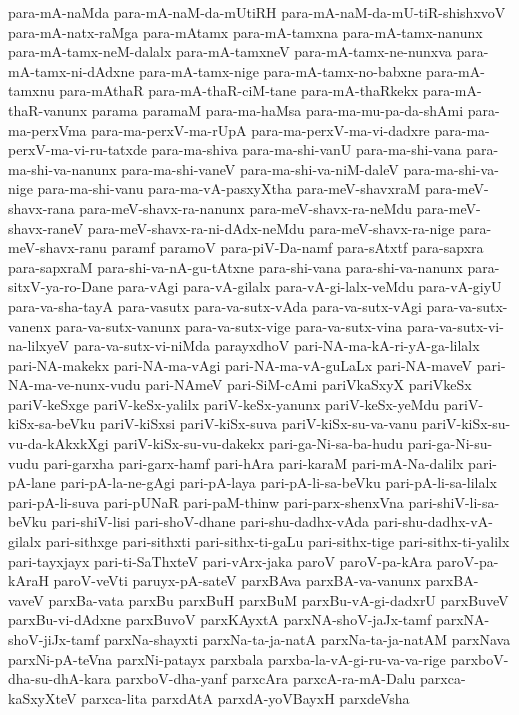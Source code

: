 {para-mA-naMda
para-mA-naM-da-mUtiRH
para-mA-naM-da-mU-tiR-shishxvoV
para-mA-natx-raMga
para-mAtamx
para-mA-tamxna
para-mA-tamx-nanunx
para-mA-tamx-neM-dalalx
para-mA-tamxneV
para-mA-tamx-ne-nunxva
para-mA-tamx-ni-dAdxne
para-mA-tamx-nige
para-mA-tamx-no-babxne
para-mA-tamxnu
para-mAthaR
para-mA-thaR-ciM-tane
para-mA-thaRkekx
para-mA-thaR-vanunx
parama
paramaM
para-ma-haMsa
para-ma-mu-pa-da-shAmi
para-ma-perxVma
para-ma-perxV-ma-rUpA
para-ma-perxV-ma-vi-dadxre
para-ma-perxV-ma-vi-ru-tatxde
para-ma-shiva
para-ma-shi-vanU
para-ma-shi-vana
para-ma-shi-va-nanunx
para-ma-shi-vaneV
para-ma-shi-va-niM-daleV
para-ma-shi-va-nige
para-ma-shi-vanu
para-ma-vA-pasxyXtha
para-meV-shavxraM
para-meV-shavx-rana
para-meV-shavx-ra-nanunx
para-meV-shavx-ra-neMdu
para-meV-shavx-raneV
para-meV-shavx-ra-ni-dAdx-neMdu
para-meV-shavx-ra-nige
para-meV-shavx-ranu
paramf
paramoV
para-piV-Da-namf
para-sAtxtf
para-sapxra
para-sapxraM
para-shi-va-nA-gu-tAtxne
para-shi-vana
para-shi-va-nanunx
para-sitxV-ya-ro-Dane
para-vAgi
para-vA-gilalx
para-vA-gi-lalx-veMdu
para-vA-giyU
para-va-sha-tayA
para-vasutx
para-va-sutx-vAda
para-va-sutx-vAgi
para-va-sutx-vanenx
para-va-sutx-vanunx
para-va-sutx-vige
para-va-sutx-vina
para-va-sutx-vi-na-lilxyeV
para-va-sutx-vi-niMda
parayxdhoV
pari-NA-ma-kA-ri-yA-ga-lilalx
pari-NA-makekx
pari-NA-ma-vAgi
pari-NA-ma-vA-guLaLx
pari-NA-maveV
pari-NA-ma-ve-nunx-vudu
pari-NAmeV
pari-SiM-cAmi
pariVkaSxyX
pariVkeSx
pariV-keSxge
pariV-keSx-yalilx
pariV-keSx-yanunx
pariV-keSx-yeMdu
pariV-kiSx-sa-beVku
pariV-kiSxsi
pariV-kiSx-suva
pariV-kiSx-su-va-vanu
pariV-kiSx-su-vu-da-kAkxkXgi
pariV-kiSx-su-vu-dakekx
pari-ga-Ni-sa-ba-hudu
pari-ga-Ni-su-vudu
pari-garxha
pari-garx-hamf
pari-hAra
pari-karaM
pari-mA-Na-dalilx
pari-pA-lane
pari-pA-la-ne-gAgi
pari-pA-laya
pari-pA-li-sa-beVku
pari-pA-li-sa-lilalx
pari-pA-li-suva
pari-pUNaR
pari-paM-thinw
pari-parx-shenxVna
pari-shiV-li-sa-beVku
pari-shiV-lisi
pari-shoV-dhane
pari-shu-dadhx-vAda
pari-shu-dadhx-vA-gilalx
pari-sithxge
pari-sithxti
pari-sithx-ti-gaLu
pari-sithx-tige
pari-sithx-ti-yalilx
pari-tayxjayx
pari-ti-SaThxteV
pari-vArx-jaka
paroV
paroV-pa-kAra
paroV-pa-kAraH
paroV-veVti
paruyx-pA-sateV
parxBAva
parxBA-va-vanunx
parxBA-vaveV
parxBa-vata
parxBu
parxBuH
parxBuM
parxBu-vA-gi-dadxrU
parxBuveV
parxBu-vi-dAdxne
parxBuvoV
parxKAyxtA
parxNA-shoV-jaJx-tamf
parxNA-shoV-jiJx-tamf
parxNa-shayxti
parxNa-ta-ja-natA
parxNa-ta-ja-natAM
parxNava
parxNi-pA-teVna
parxNi-patayx
parxbala
parxba-la-vA-gi-ru-va-va-rige
parxboV-dha-su-dhA-kara
parxboV-dha-yanf
parxcAra
parxcA-ra-mA-Dalu
parxca-kaSxyXteV
parxca-lita
parxdAtA
parxdA-yoVBayxH
parxdeVsha
}
